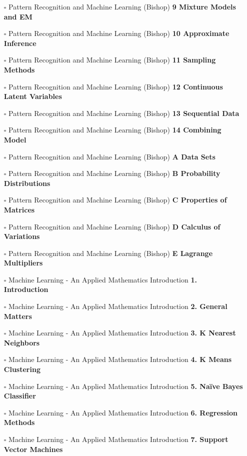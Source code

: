 \documentclass[a4, landscape, 12pt]{article}
\newcommand{\checkbox}{$\square$}%
\begin{document}
\begin{itemize}
{}
\item [\checkbox]  Pattern Recognition and Machine Learning (Bishop) \textbf{ 9 Mixture Models and EM
}
\item [\checkbox]  Pattern Recognition and Machine Learning (Bishop) \textbf{ 10 Approximate Inference
}
\item [\checkbox]  Pattern Recognition and Machine Learning (Bishop) \textbf{ 11 Sampling Methods
}
\item [\checkbox]  Pattern Recognition and Machine Learning (Bishop) \textbf{ 12 Continuous Latent Variables
}
\item [\checkbox]  Pattern Recognition and Machine Learning (Bishop) \textbf{ 13 Sequential Data
}
\item [\checkbox]  Pattern Recognition and Machine Learning (Bishop) \textbf{ 14 Combining Model
}
\item [\checkbox]  Pattern Recognition and Machine Learning (Bishop) \textbf{ A Data Sets
}
\item [\checkbox]  Pattern Recognition and Machine Learning (Bishop) \textbf{ B Probability Distributions
}
\item [\checkbox]  Pattern Recognition and Machine Learning (Bishop) \textbf{ C Properties of Matrices
}
\item [\checkbox]  Pattern Recognition and Machine Learning (Bishop) \textbf{ D Calculus of Variations
}
\item [\checkbox]  Pattern Recognition and Machine Learning (Bishop) \textbf{ E Lagrange Multipliers
}
\item [\checkbox]  Machine Learning - An Applied Mathematics Introduction \textbf{ 1. Introduction
}
\item [\checkbox]  Machine Learning - An Applied Mathematics Introduction \textbf{ 2. General Matters
}
\item [\checkbox]  Machine Learning - An Applied Mathematics Introduction \textbf{ 3. K Nearest Neighbors
}
\item [\checkbox]  Machine Learning - An Applied Mathematics Introduction \textbf{ 4. K Means Clustering
}
\item [\checkbox]  Machine Learning - An Applied Mathematics Introduction \textbf{ 5. Naïve Bayes Classifier
}
\item [\checkbox]  Machine Learning - An Applied Mathematics Introduction \textbf{ 6. Regression Methods
}
\item [\checkbox]  Machine Learning - An Applied Mathematics Introduction \textbf{ 7. Support Vector Machines
}
\end{itemize}
\end{document}
